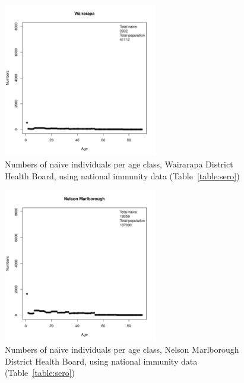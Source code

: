 \documentclass{article}
\begin{document}
\begin{itemize}
\begin{figure}[H]
     \begin{center}
     \includegraphics[width=0.6\textwidth]{dhb15.pdf}
     \end{center}
     \caption{Numbers of na\"{\i}ve individuals per age class, Wairarapa District Health Board, using national immunity data (Table~\ref{table:sero})}
     \label{fig:Wairarapa}
\end{figure}

\begin{figure}[H]
     \begin{center}
     \includegraphics[width=0.6\textwidth]{dhb16.pdf}
     \end{center}
     \caption{Numbers of na\"{\i}ve individuals per age class, Nelson Marlborough District Health Board, using national immunity data (Table~\ref{table:sero})}
     \label{fig:NelsonMarlborough}
\end{figure}


\end{itemize}
\end{document}
